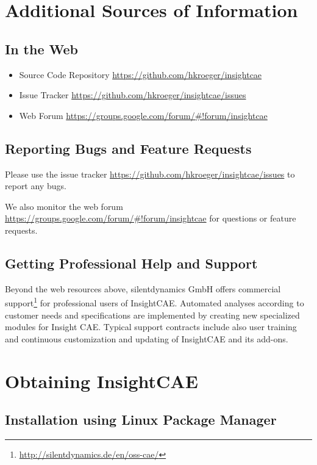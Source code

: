 \section{Additional Sources of Information}

\subsection{In the Web}

\begin{itemize}
\item Source Code Repository \url{https://github.com/hkroeger/insightcae}
\item Issue Tracker \url{https://github.com/hkroeger/insightcae/issues}
\item Web Forum \url{https://groups.google.com/forum/#!forum/insightcae}
\end{itemize}

\subsection{Reporting Bugs and Feature Requests}

Please use the issue tracker \url{https://github.com/hkroeger/insightcae/issues} to report any bugs.

We also monitor the web forum \url{https://groups.google.com/forum/#!forum/insightcae} for questions or feature requests.

\subsection{Getting Professional Help and Support}

Beyond the web resources above, silentdynamics GmbH offers commercial support\footnote{\url{http://silentdynamics.de/en/oss-cae/}} for professional users of InsightCAE. Automated analyses according to customer needs and specifications are implemented  by creating new specialized modules for Insight CAE.
Typical support contracts include also user training and continuous customization and updating of InsightCAE and its add-ons.






\section{Obtaining InsightCAE}
\label{obtaining_insightcae}

\subsection{Installation using Linux Package Manager}

